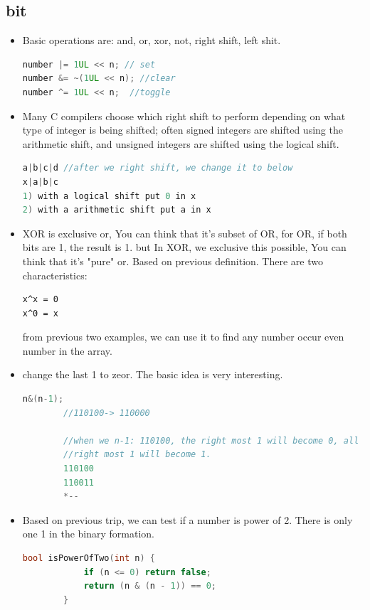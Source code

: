 \documentclass[a4paper,11pt,twoside]{book}
\begin{document}
\subsection{bit}
\begin{itemize}
	\item Basic operations are: and, or, xor, not, right shift, left shit. 
\begin{lstlisting}[frame=single, language=c++]	
number |= 1UL << n; // set
number &= ~(1UL << n); //clear
number ^= 1UL << n;  //toggle
\end{lstlisting}

	\item Many C compilers choose which right shift to perform depending on what type of integer is being shifted; often signed integers are shifted using the arithmetic shift, and unsigned integers are shifted using the logical shift.
	
\begin{lstlisting}[frame=single, language=c++]	
a|b|c|d //after we right shift, we change it to below
x|a|b|c
1) with a logical shift put 0 in x
2) with a arithmetic shift put a in x
\end{lstlisting}	
	
	\item XOR is exclusive or, You can think that it's subset of OR, for OR, if both bits are 1, the result is 1. but In XOR, we exclusive this possible,  You can think that it's "pure" or.  Based on previous definition. There are two characteristics:
\begin{lstlisting}
x^x = 0
x^0 = x
\end{lstlisting}
	from previous two examples, we can use it to find any number occur even number in the array. 
		
	\item change the last 1 to zeor. The basic idea is very interesting. 
	\begin{lstlisting}[frame=single, language=c++]	
		n&(n-1);
		//110100-> 110000
		
		//when we n-1: 110100, the right most 1 will become 0, all zeor after 
		//right most 1 will become 1. 
		110100
		110011
		*--
	\end{lstlisting}
	
	\item Based on previous trip, we can test if a number is power of 2. There is only one 1 in the binary formation.
	\begin{lstlisting}[frame=single, language=c++]	
		bool isPowerOfTwo(int n) {
			if (n <= 0) return false;
			return (n & (n - 1)) == 0;
		}	
	\end{lstlisting}
	

\end{itemize}
\end{document}
